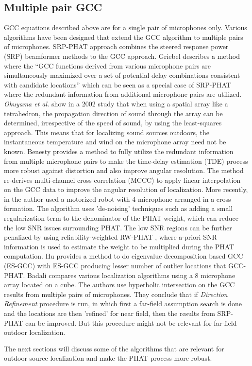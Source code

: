 \subsection{Multiple pair GCC}

GCC equations described above are for a single pair of microphones only. Various algorithms have been designed that extend the GCC algorithm to multiple pairs of microphones. SRP-PHAT approach \cite{dibiase2000high} combines the steered response power (SRP) beamformer methods \cite{krim1996two} to the GCC approach. Griebel \cite{griebel2001microphone} describes a method where the \enquote{GCC functions derived from various microphone pairs are simultaneously maximized over a set of potential delay combinations consistent with candidate locations} which can be seen as a special case of SRP-PHAT where the redundant information from additional microphone pairs are utilized. \textit{Okuyama et al.} show in a 2002 study\cite{okuyama2002study} that when using a spatial array like a tetrahedron, the propagation direction of sound through the array can be determined, irrespective of the speed of sound, by using the least-squares approach. This means that for localizing sound sources outdoors, the instantaneous temperature and wind on the microphone array need not be known. Benesty \cite{benesty2004time} provides a method to fully utilize the redundant information from multiple microphone pairs to make the time-delay estimation (TDE) process more robust against distortion and also improve angular resolution. The method re-derives multi-channel cross correlation (MCCC) to apply linear interpolation on the GCC data to improve the angular resolution of localization. More recently, in \cite{liu2010continuous} the author used a motorized robot with 4 microphone arranged in a cross-formation. The algorithm uses 'de-noising' techniques such as adding a small regularization term to the denominator of the PHAT weight, which can reduce the low SNR issues surrounding PHAT. The low SNR regions can be further penalized by using reliability-weighted RW-PHAT \cite{valin2006robust}, where a-priori SNR information is used to estimate the weight to be multiplied during the PHAT computation. Hu\cite{hu2009estimation} provides a method to do eigenvalue decomposition based GCC (ES-GCC) with ES-GCC producing lesser number of outlier locations that GCC-PHAT. Badali \cite{badali2009evaluating} compares various localization algorithms using a 8 microphone array located on a cube. The authors use hyperbolic intersection on the GCC results from multiple pairs of microphones. They conclude that if \textit{Direction Refinement} procedure is run, in which first a far-field assumption search is done and the locations are then 'refined' for near field, then the results from SRP-PHAT can be improved. But this procedure might not be relevant for far-field outdoor localization.  

The next sections will discuss some of the algorithms that are relevant for outdoor source localization and make the PHAT process more robust. 